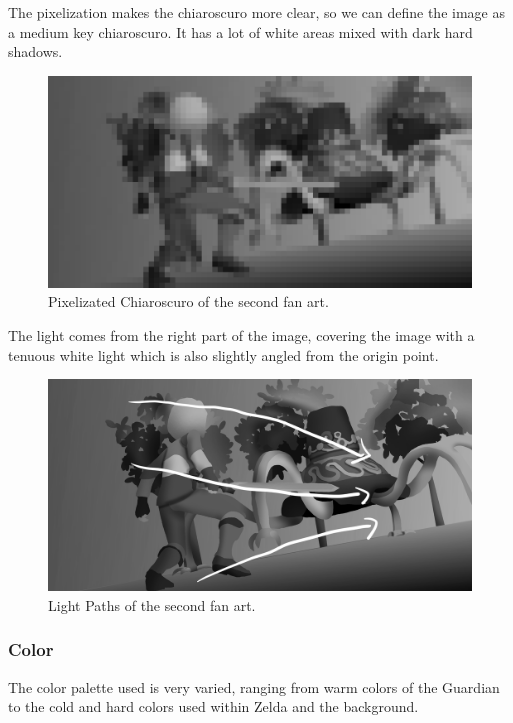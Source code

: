 \documentclass{cup-pan}
\begin{document}
            The pixelization makes the chiaroscuro more clear, so we can define the image as a medium key chiaroscuro. It has a lot of white areas mixed with dark hard shadows.\\
            \begin{figure}[H]
                \includegraphics[width=\textwidth]{Imagenes/Fanart2/Analysis/pixel.png}
                \caption{Pixelizated Chiaroscuro of the second fan art.}
            \end{figure}

            The light comes from the right part of the image, covering the image with a tenuous white light which is also slightly angled from the origin point. 
            \begin{figure}[H]
                \includegraphics[width=\textwidth]{Imagenes/Fanart2/Analysis/recorrido luz.png}
                \caption{Light Paths of the second fan art.}
            \end{figure}

        \subsubsection{Color}

            The color palette used is very varied, ranging from warm colors of the Guardian to the cold and hard colors used within Zelda and the background.
\end{document}
